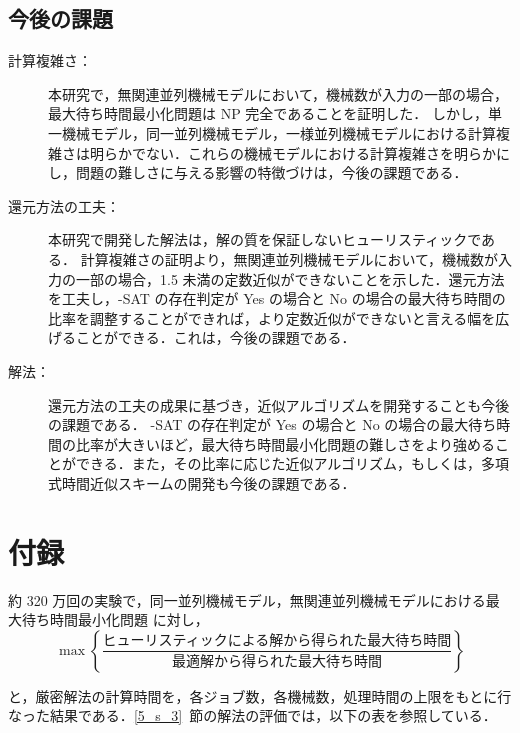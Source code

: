 \documentclass[12pt]{optlab-bachelor}
\renewcommand{\bibname}{参考文献}
\begin{document}
\section{今後の課題}
\begin{description}
  \item[計算複雑さ：] 本研究で，無関連並列機械モデルにおいて，機械数が入力の一部の場合，最大待ち時間最小化問題は NP 完全であることを証明した．
  しかし，単一機械モデル，同一並列機械モデル，一様並列機械モデルにおける計算複雑さは明らかでない．これらの機械モデルにおける計算複雑さを明らかにし，問題の難しさに与える影響の特徴づけは，今後の課題である．

  \item[還元方法の工夫：] 本研究で開発した解法は，解の質を保証しないヒューリスティックである．
  計算複雑さの証明より，無関連並列機械モデルにおいて，機械数が入力の一部の場合，1.5 未満の定数近似ができないことを示した．還元方法を工夫し，{-SAT} の存在判定が Yes の場合と No の場合の最大待ち時間の比率を調整することができれば，より定数近似ができないと言える幅を広げることができる．これは，今後の課題である．

  \item[解法：]
  還元方法の工夫の成果に基づき，近似アルゴリズムを開発することも今後の課題である．
  {-SAT} の存在判定が Yes の場合と No の場合の最大待ち時間の比率が大きいほど，最大待ち時間最小化問題の難しさをより強めることができる．また，その比率に応じた近似アルゴリズム，もしくは，多項式時間近似スキームの開発も今後の課題である．

\end{description}
\addcontentsline{toc}{chapter}{\bibname}



\appendix
\chapter{付録}\label{c_7}
約 320 万回の実験で，同一並列機械モデル，無関連並列機械モデルにおける最大待ち時間最小化問題 に対し，
\begin{displaymath}
  \max \left\{ \frac{\text{ヒューリスティックによる解から得られた最大待ち時間}}{\text{最適解から得られた最大待ち時間}}\right\}
\end{displaymath}

と，厳密解法の計算時間を，各ジョブ数，各機械数，処理時間の上限をもとに行なった結果である．\ref{5_s_3}~節の解法の評価では，以下の表を参照している．
\end{document}
